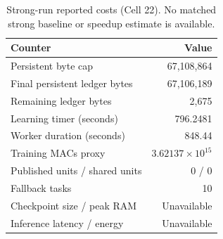 \begin{table}[t]
\caption{Strong-run reported costs (Cell 22). No matched strong baseline or speedup estimate is available.}
\label{tab:cost}\centering\small
\begin{tabularx}{\linewidth}{Yr}\toprule
Counter & Value\\\midrule
Persistent byte cap & 67,108,864\\
Final persistent ledger bytes & 67,106,189\\
Remaining ledger bytes & 2,675\\
Learning timer (seconds) & 796.2481\\
Worker duration (seconds) & 848.44\\
Training MACs proxy & $3.62137\times10^{15}$\\
Published units / shared units & 0 / 0\\
Fallback tasks & 10\\
Checkpoint size / peak RAM & Unavailable\\
Inference latency / energy & Unavailable\\
\bottomrule\end{tabularx}\end{table}

